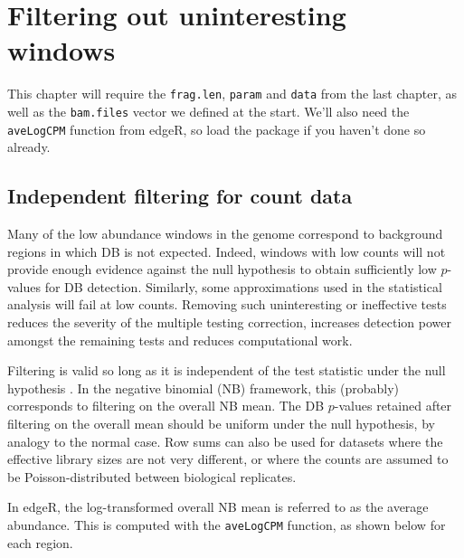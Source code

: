 \documentclass[12pt]{report}
\newcommand{\edger}{edgeR}
\newcommand{\code}[1]{{\small\texttt{#1}}}
\newenvironment{combox}
{ \begin{shaded}\begin{center}\begin{minipage}[t]{0.95\textwidth} }
{ \end{minipage}\end{center}\end{shaded} }
\begin{document}

\chapter{Filtering out uninteresting windows}
\label{chap:filter}

\begin{combox}
This chapter will require the \code{frag.len}, \code{param} and \code{data} from the last chapter, as well as the \code{bam.files} vector we defined at the start.
We'll also need the \code{aveLogCPM} function from \edger{}, so load the package if you haven't done so already.
\end{combox}

\section{Independent filtering for count data}
Many of the low abundance windows in the genome correspond to background regions in which DB is not expected. 
Indeed, windows with low counts will not provide enough evidence against the null hypothesis to obtain sufficiently low $p$-values for DB detection. 
Similarly, some approximations used in the statistical analysis will fail at low counts. 
Removing such uninteresting or ineffective tests reduces the severity of the multiple testing correction, increases detection power amongst the remaining tests and reduces computational work.

Filtering is valid so long as it is independent of the test statistic under the null hypothesis \citep{bourgon2010}. 
In the negative binomial (NB) framework, this (probably) corresponds to filtering on the overall NB mean. 
The DB $p$-values retained after filtering on the overall mean should be uniform under the null hypothesis, by analogy to the normal case. 
Row sums can also be used for datasets where the effective library sizes are not very different, or where the counts are assumed to be Poisson-distributed between biological replicates. 

In \edger{}, the log-transformed overall NB mean is referred to as the average abundance.
This is computed with the \code{aveLogCPM} function, as shown below for each region.
\end{document}
